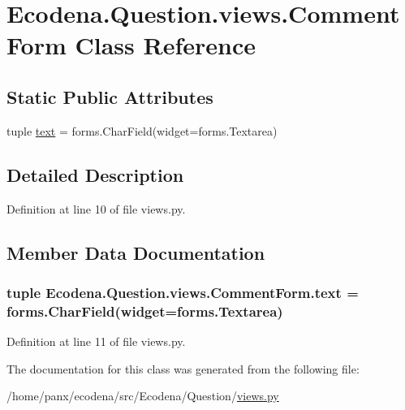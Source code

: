 \hypertarget{class_ecodena_1_1_question_1_1views_1_1_comment_form}{
\section{Ecodena.Question.views.CommentForm Class Reference}
\label{d1/dd1/class_ecodena_1_1_question_1_1views_1_1_comment_form}
}
\subsection*{Static Public Attributes}
\begin{DoxyCompactItemize}
\item 
tuple \hyperlink{class_ecodena_1_1_question_1_1views_1_1_comment_form_a698d74b3868829c3b183a79051af04e9}{text} = forms.CharField(widget=forms.Textarea)
\end{DoxyCompactItemize}


\subsection{Detailed Description}


Definition at line 10 of file views.py.



\subsection{Member Data Documentation}
\hypertarget{class_ecodena_1_1_question_1_1views_1_1_comment_form_a698d74b3868829c3b183a79051af04e9}{
\subsubsection[{text}]{\setlength{\rightskip}{0pt plus 5cm}tuple {\bf Ecodena.Question.views.CommentForm.text} = forms.CharField(widget=forms.Textarea)}}
\label{d1/dd1/class_ecodena_1_1_question_1_1views_1_1_comment_form_a698d74b3868829c3b183a79051af04e9}


Definition at line 11 of file views.py.



The documentation for this class was generated from the following file:\begin{DoxyCompactItemize}
\item 
/home/panx/ecodena/src/Ecodena/Question/\hyperlink{_question_2views_8py}{views.py}\end{DoxyCompactItemize}
